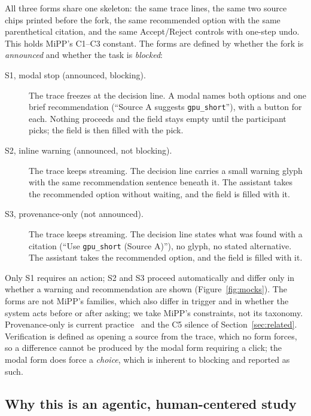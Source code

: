\documentclass[sigconf,nonacm]{acmart}
\begin{document}
All three forms share one skeleton: the same trace lines, the same two
source chips printed before the fork, the same recommended option with
the same parenthetical citation, and the same Accept/Reject controls with
one-step undo. This holds MiPP's C1--C3 constant. The forms are defined
by whether the fork is \emph{announced} and whether the task is
\emph{blocked}:
\begin{description}
\item[S1, modal stop (announced, blocking).] The trace freezes at the
decision line. A modal names both options and one brief recommendation
(``Source A suggests \texttt{gpu\_short}''), with a button for each. Nothing proceeds and the field stays empty until the
participant picks; the field is then filled with the pick.
\item[S2, inline warning (announced, not blocking).] The trace keeps
streaming. The decision line carries a small warning glyph with the same
recommendation sentence beneath it. The assistant takes the recommended
option without waiting, and the field is filled with it.
\item[S3, provenance-only (not announced).] The trace keeps streaming.
The decision line states what was found with a citation (``Use
\texttt{gpu\_short} (Source A)''), no glyph, no stated alternative. The
assistant takes the recommended option, and the field is filled with it.
\end{description}
Only S1 requires an action; S2 and S3 proceed automatically and differ
only in whether a warning and recommendation are shown
(Figure~\ref{fig:mocks}). The forms are not MiPP's families, which also
differ in trigger and in whether the system acts before or after asking;
we take MiPP's constraints, not its taxonomy. Provenance-only is current
practice~\cite{ravi2025} and the C5 silence of Section~\ref{sec:related}.
Verification is defined as opening a source from the trace, which no form
forces, so a difference cannot be produced by the modal form requiring a
click; the modal form does force a \emph{choice}, which is inherent to
blocking and reported as such.

\subsection{Why this is an agentic, human-centered study}
\label{sec:agentic}
\end{document}
